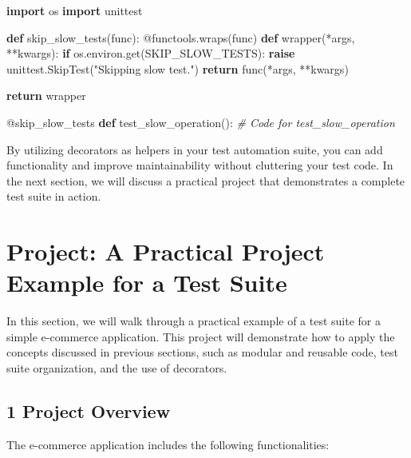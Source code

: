 \documentclass[
  paper=a4,
  ,captions=tableheading
]{scrartcl}
\newenvironment{Shaded}{}{}
\newcommand{\AttributeTok}[1]{\textcolor[rgb]{0.49,0.56,0.16}{#1}}
\newcommand{\CommentTok}[1]{\textcolor[rgb]{0.38,0.63,0.69}{\textit{#1}}}
\newcommand{\ControlFlowTok}[1]{\textcolor[rgb]{0.00,0.44,0.13}{\textbf{#1}}}
\newcommand{\ImportTok}[1]{\textcolor[rgb]{0.00,0.50,0.00}{\textbf{#1}}}
\newcommand{\KeywordTok}[1]{\textcolor[rgb]{0.00,0.44,0.13}{\textbf{#1}}}
\newcommand{\NormalTok}[1]{#1}
\newcommand{\OperatorTok}[1]{\textcolor[rgb]{0.40,0.40,0.40}{#1}}
\newcommand{\StringTok}[1]{\textcolor[rgb]{0.25,0.44,0.63}{#1}}
\begin{document}
\begin{Shaded}
\begin{Highlighting}[]
\ImportTok{import}\NormalTok{ os}
\ImportTok{import}\NormalTok{ unittest}

\KeywordTok{def}\NormalTok{ skip\_slow\_tests(func):}
    \AttributeTok{@functools.wraps}\NormalTok{(func)}
    \KeywordTok{def}\NormalTok{ wrapper(}\OperatorTok{*}\NormalTok{args, }\OperatorTok{**}\NormalTok{kwargs):}
        \ControlFlowTok{if}\NormalTok{ os.environ.get(}\StringTok{\textquotesingle{}SKIP\_SLOW\_TESTS\textquotesingle{}}\NormalTok{):}
            \ControlFlowTok{raise}\NormalTok{ unittest.SkipTest(}\StringTok{"Skipping slow test."}\NormalTok{)}
        \ControlFlowTok{return}\NormalTok{ func(}\OperatorTok{*}\NormalTok{args, }\OperatorTok{**}\NormalTok{kwargs)}

    \ControlFlowTok{return}\NormalTok{ wrapper}

\AttributeTok{@skip\_slow\_tests}
\KeywordTok{def}\NormalTok{ test\_slow\_operation():}
    \CommentTok{\# Code for test\_slow\_operation}
\end{Highlighting}
\end{Shaded}

By utilizing decorators as helpers in your test automation suite, you
can add functionality and improve maintainability without cluttering
your test code. In the next section, we will discuss a practical project
that demonstrates a complete test suite in action.

\hypertarget{project-a-practical-project-example-for-a-test-suite}{%
\section{Project: A Practical Project Example for a Test
Suite}\label{project-a-practical-project-example-for-a-test-suite}}

In this section, we will walk through a practical example of a test
suite for a simple e-commerce application. This project will demonstrate
how to apply the concepts discussed in previous sections, such as
modular and reusable code, test suite organization, and the use of
decorators.

\hypertarget{project-overview-2}{%
\subsection{1 Project Overview}\label{project-overview-2}}

The e-commerce application includes the following functionalities:
\end{document}

